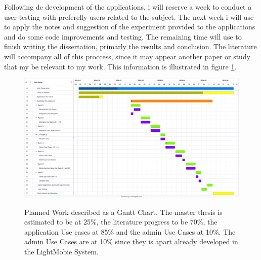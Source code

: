   Following de development of the applications, i will reserve a week to conduct a user testing with preferelly users related to the subject.
  The next week i will use to apply the notes and suggestion of the experiment provided to the applications and do some code improvements and testing.
  The remaining time will use to finish writing the dissertation, primarly the results and conclusion.
  The literature will accompany all of this proccess, since it may appear another paper or study that my be relevant to my work.
  This information is illustrated in figure \ref{fig:figure1}.

    \begin{figure}[h]
      \caption{Planned Work described as a Gantt Chart. The master thesis is estimated to be at 25\%, the literature progress to be 70\%, the application Use cases at 85\% and the admin Use Cases at 10\%. The admin Use Cases are at 10\% since they is apart already developed in the LightMobie System.}
      \centering
      \includegraphics[width=\textwidth]{figs/Gantt}
      \label{fig:figure1}
    \end{figure}
